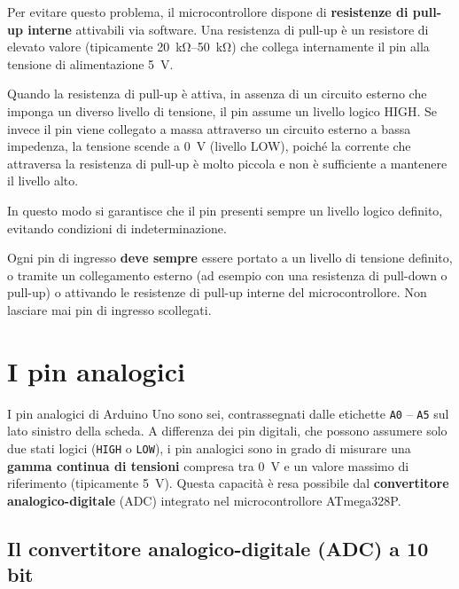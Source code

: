 Per evitare questo problema, il microcontrollore dispone di \textbf{resistenze di pull-up interne} attivabili via software. Una resistenza di pull-up è un resistore di elevato valore (tipicamente \SIrange{20}{50}{\kilo\ohm}) che collega internamente il pin alla tensione di alimentazione \SI{5}{\volt}.

Quando la resistenza di pull-up è attiva, in assenza di un circuito esterno che imponga un diverso livello di tensione, il pin assume un livello logico HIGH. Se invece il pin viene collegato a massa attraverso un circuito esterno a bassa impedenza, la tensione scende a \SI{0}{\volt} (livello LOW), poiché la corrente che attraversa la resistenza di pull-up è molto piccola e non è sufficiente a mantenere il livello alto.

In questo modo si garantisce che il pin presenti sempre un livello logico definito, evitando condizioni di indeterminazione.


\begin{tcolorbox}[colback=blue!4, colframe=blue!60, title=\textbf{Buona pratica – Evitare pin flottanti}]
    Ogni pin di ingresso \textbf{deve sempre} essere portato a un livello di tensione definito, o tramite un collegamento esterno (ad esempio con una resistenza di pull-down o pull-up) o attivando le resistenze di pull-up interne del microcontrollore. Non lasciare mai pin di ingresso scollegati.
\end{tcolorbox}

\section{I pin analogici}

I pin analogici di Arduino Uno sono sei, contrassegnati dalle etichette \texttt{A0} – \texttt{A5} sul lato sinistro della scheda. A differenza dei pin digitali, che possono assumere solo due stati logici (\texttt{HIGH} o \texttt{LOW}), i pin analogici sono in grado di misurare una \textbf{gamma continua di tensioni} compresa tra \SI{0}{\volt} e un valore massimo di riferimento (tipicamente \SI{5}{\volt}). Questa capacità è resa possibile dal \textbf{convertitore analogico-digitale} (ADC) integrato nel microcontrollore ATmega328P.

\subsection*{Il convertitore analogico-digitale (ADC) a 10 bit}

